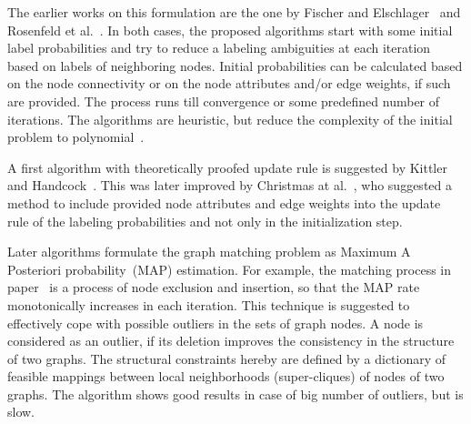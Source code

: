 The earlier works on this formulation are the one by Fischer and Elschlager~\cite{Fischler1973} and Rosenfeld et al.~\cite{Rosenfeld1976}. In both cases, the proposed algorithms start with some initial label probabilities and try to reduce a labeling ambiguities at each iteration based on labels of neighboring nodes. Initial probabilities can be calculated based on the node connectivity or on the node attributes and/or edge weights, if such are provided. The process runs till convergence or some predefined number of iterations. The algorithms are heuristic, but reduce the complexity of the initial problem to polynomial~\cite{Christmas1995}.

A first algorithm with theoretically proofed update rule is suggested by Kittler and Handcock~\cite{Hancock_Kittler}. This was later improved by Christmas at al.~\cite{Christmas1995}, who suggested a method to include provided node attributes and edge weights into the update rule of the labeling probabilities and not only in the initialization step.

Later algorithms formulate the graph matching problem as Maximum A Posteriori probability~(MAP) estimation. For example, the matching process in paper~\cite{Hancock_StrucMatch} is a process of node exclusion and insertion, so that the MAP rate monotonically increases in each iteration. This technique is suggested to effectively cope with possible outliers in the sets of graph nodes. A node is considered as an outlier, if its deletion improves the consistency in the structure of two graphs. The structural constraints hereby are defined by a dictionary of feasible mappings between local neighborhoods (super-cliques) of nodes of two graphs. The algorithm shows good results in case of big number of outliers, but is slow.

